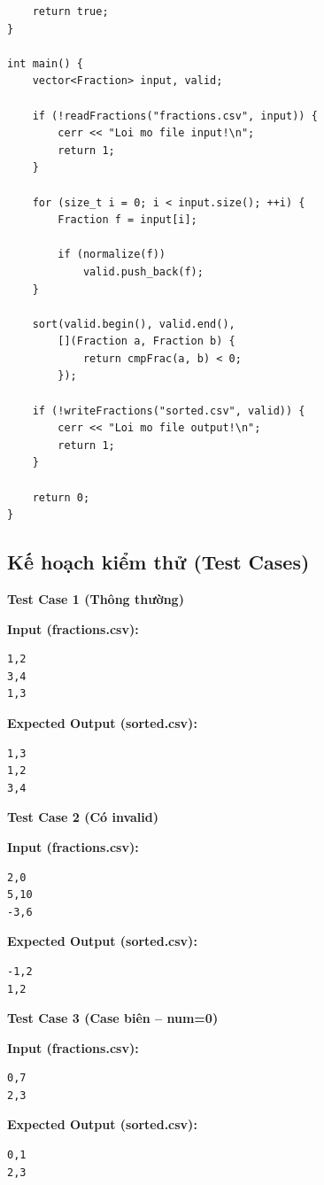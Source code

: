 \begin{lstlisting}
    return true;
}

int main() {
    vector<Fraction> input, valid;

    if (!readFractions("fractions.csv", input)) {
        cerr << "Loi mo file input!\n";
        return 1;
    }

    for (size_t i = 0; i < input.size(); ++i) {
        Fraction f = input[i];

        if (normalize(f))
            valid.push_back(f);
    }

    sort(valid.begin(), valid.end(),
        [](Fraction a, Fraction b) {
            return cmpFrac(a, b) < 0;
        });

    if (!writeFractions("sorted.csv", valid)) {
        cerr << "Loi mo file output!\n";
        return 1;
    }

    return 0;
}
\end{lstlisting}

\subsection{Kế hoạch kiểm thử (Test Cases)}

\textbf{Test Case 1 (Thông thường)}

\textbf{Input (fractions.csv):}
\begin{lstlisting}
1,2
3,4
1,3
\end{lstlisting}

\textbf{Expected Output (sorted.csv):}
\begin{lstlisting}
1,3
1,2
3,4
\end{lstlisting}

\vspace{0.5cm}

\textbf{Test Case 2 (Có invalid)}

\textbf{Input (fractions.csv):}
\begin{lstlisting}
2,0
5,10
-3,6
\end{lstlisting}

\textbf{Expected Output (sorted.csv):}
\begin{lstlisting}
-1,2
1,2
\end{lstlisting}

\vspace{0.5cm}

\textbf{Test Case 3 (Case biên -- num=0)}

\textbf{Input (fractions.csv):}
\begin{lstlisting}
0,7
2,3
\end{lstlisting}

\textbf{Expected Output (sorted.csv):}
\begin{lstlisting}
0,1
2,3
\end{lstlisting}